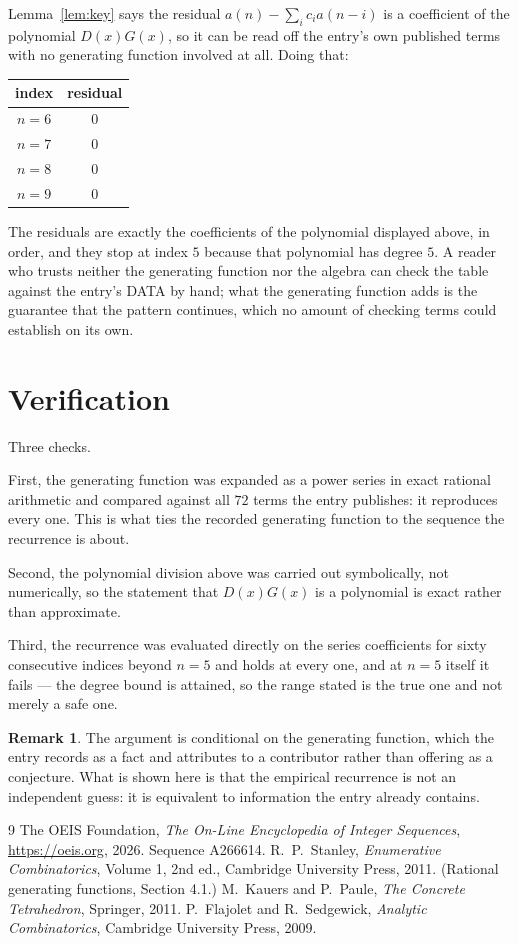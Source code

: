 \documentclass[11pt,a4paper]{article}
\theoremstyle{plain}
\theoremstyle{definition}
\newtheorem{remark}[theorem]{Remark}
\begin{document}
Lemma~\ref{lem:key} says the residual $a(n)-\sum_ic_ia(n-i)$ is a coefficient of the
polynomial $D(x)G(x)$, so it can be read off the entry's own published terms with no
generating function involved at all. Doing that:
\begin{center}
\begin{tabular}{cc}
index & residual \\ \hline
$n=6$ & $0$ \\
$n=7$ & $0$ \\
$n=8$ & $0$ \\
$n=9$ & $0$
\end{tabular}
\end{center}
The residuals are exactly the coefficients of the polynomial displayed above, in order, and
they stop at index $5$ because that polynomial has degree $5$. A reader who trusts
neither the generating function nor the algebra can check the table against the entry's DATA
by hand; what the generating function adds is the guarantee that the pattern continues, which
no amount of checking terms could establish on its own.

\section{Verification}

Three checks.

First, the generating function was expanded as a power series in exact rational arithmetic and
compared against all $72$ terms the entry publishes: it reproduces every one. This is
what ties the recorded generating function to the sequence the recurrence is about.

Second, the polynomial division above was carried out symbolically, not numerically, so the
statement that $D(x)G(x)$ is a polynomial is exact rather than approximate.

Third, the recurrence was evaluated directly on the series coefficients for sixty consecutive
indices beyond $n=5$ and holds at every one, and at $n=5$ itself it fails --- the
degree bound is attained, so the range stated is the true one and not merely a safe one.

\begin{remark}
The argument is conditional on the generating function, which the entry records as a fact and
attributes to a contributor rather than offering as a conjecture. What is shown here is that
the empirical recurrence is not an independent guess: it is equivalent to information the
entry already contains.
\end{remark}

\begin{thebibliography}{9}
 The OEIS Foundation, \emph{The On-Line Encyclopedia of Integer
Sequences}, \url{https://oeis.org}, 2026. Sequence A266614.
 R.~P.~Stanley, \emph{Enumerative Combinatorics}, Volume 1, 2nd ed.,
Cambridge University Press, 2011. (Rational generating functions, Section 4.1.)
 M.~Kauers and P.~Paule, \emph{The Concrete Tetrahedron}, Springer, 2011.
 P.~Flajolet and R.~Sedgewick, \emph{Analytic Combinatorics}, Cambridge
University Press, 2009.
\end{thebibliography}
\end{document}
